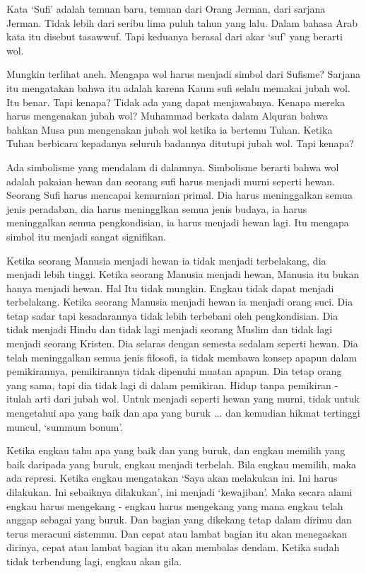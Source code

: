 Kata ‘Sufi’ adalah temuan baru, temuan dari Orang Jerman, dari sarjana Jerman. Tidak lebih dari seribu lima puluh tahun yang lalu. Dalam bahasa Arab kata itu disebut tasawwuf. Tapi keduanya berasal dari akar ‘suf’ yang berarti wol.

Mungkin terlihat aneh. Mengapa wol harus menjadi simbol dari Sufisme? Sarjana itu mengatakan bahwa itu adalah karena Kaum sufi selalu memakai jubah wol. Itu benar. Tapi kenapa? Tidak ada yang dapat menjawabnya. Kenapa mereka harus mengenakan jubah wol? Muhammad berkata dalam Alquran bahwa bahkan Musa pun mengenakan jubah wol ketika ia bertemu Tuhan. Ketika Tuhan berbicara kepadanya seluruh badannya ditutupi jubah wol. Tapi kenapa?

Ada simbolisme yang mendalam di dalamnya. Simbolisme berarti bahwa wol adalah pakaian hewan dan seorang sufi harus menjadi murni seperti hewan. Seorang Sufi harus mencapai kemurnian primal. Dia harus meninggalkan semua jenis peradaban, dia harus meningglkan semua jenis budaya, ia harus meninggalkan semua pengkondisian, ia harus menjadi hewan lagi. Itu mengapa simbol itu menjadi sangat signifikan.

Ketika seorang Manusia menjadi hewan ia tidak menjadi terbelakang, dia menjadi lebih tinggi. Ketika seorang Manusia menjadi hewan, Manusia itu bukan hanya menjadi hewan. Hal Itu tidak mungkin. Engkau tidak dapat menjadi terbelakang. Ketika seorang Manusia menjadi hewan ia menjadi orang suci. Dia tetap sadar tapi kesadarannya tidak lebih terbebani oleh pengkondisian. Dia tidak menjadi Hindu dan tidak lagi menjadi seorang Muslim dan tidak lagi menjadi seorang Kristen. Dia selaras dengan semesta sedalam seperti hewan. Dia telah meninggalkan semua jenis filosofi, ia tidak membawa konsep apapun dalam pemikirannya, pemikirannya tidak dipenuhi muatan apapun. Dia tetap orang yang sama, tapi dia tidak lagi di dalam pemikiran. Hidup tanpa pemikiran - itulah arti dari jubah wol. Untuk menjadi seperti hewan yang murni, tidak untuk mengetahui apa yang baik dan apa yang buruk ... dan kemudian hikmat tertinggi muncul, ‘summum bonum’.

Ketika engkau tahu apa yang baik dan yang buruk, dan engkau memilih yang baik daripada yang buruk, engkau menjadi terbelah. Bila engkau memilih, maka ada represi. Ketika engkau mengatakan ‘Saya akan melakukan ini. Ini harus dilakukan. Ini sebaiknya dilakukan’, ini menjadi ‘kewajiban’. Maka secara alami engkau harus mengekang - engkau harus mengekang yang mana engkau telah anggap sebagai yang buruk. Dan bagian yang dikekang tetap dalam dirimu dan terus meracuni sistemmu. Dan cepat atau lambat bagian itu akan menegaskan dirinya, cepat atau lambat bagian itu akan membalas dendam. Ketika sudah tidak terbendung lagi, engkau akan gila.

